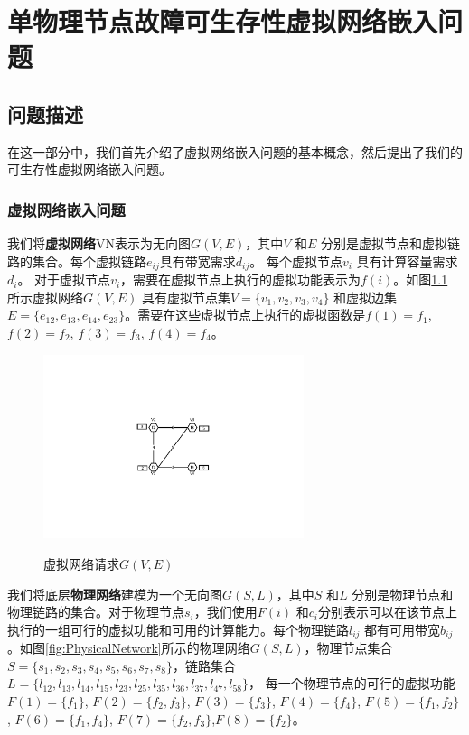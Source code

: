 \chapter{单物理节点故障可生存性虚拟网络嵌入问题}
\section{问题描述}
在这一部分中，我们首先介绍了虚拟网络嵌入问题的基本概念，然后提出了我们的可生存性虚拟网络嵌入问题。
\subsection{虚拟网络嵌入问题}
我们将\textbf{虚拟网络}VN表示为无向图$G (V,E)$，其中$V$ 和$E$ 分别是虚拟节点和虚拟链路的集合。每个虚拟链路$e_{ij}$具有带宽需求$d_{ij}$。 每个虚拟节点$v_i$ 具有计算容量需求$d_i$。 对于虚拟节点$v_i$，需要在虚拟节点上执行的虚拟功能表示为$f(i)$。如图\ref{fig:VirtualNetworkRequest} 所示虚拟网络$G (V,E)$ 具有虚拟节点集$V=\{v_1,v_2,v_3,v_4\}$ 和虚拟边集$E= \{e_{12},e_{13},e_{14},e_{23}\}$。需要在这些虚拟节点上执行的虚拟函数是$f(1)=f_1$, $f(2)=f_2$, $f(3)=f_3$, $f(4)=f_4$。

\begin{figure}[htbp]
\centering
\includegraphics[width=3.0in]{figures/VirtualNetworkRequest}\\
\caption{虚拟网络请求$G(V,E)$
}\label{fig:VirtualNetworkRequest}
\end{figure}

我们将底层\textbf{物理网络}建模为一个无向图$G (S,L)$，其中$S$ 和$L$ 分别是物理节点和物理链路的集合。对于物理节点$s_i$，我们使用$F(i)$ 和$c_i$分别表示可以在该节点上执行的一组可行的虚拟功能和可用的计算能力。每个物理链路$l_{ij}$ 都有可用带宽$b_{ij}$。如图\ref{fig:PhysicalNetwork}所示的物理网络$G (S,L)$，物理节点集合$S=\{s_1,s_2,s_3,s_4,s_5,s_6,s_7,s_8\}$，链路集合$L=\{l_{12},l_{13},l_{14},l_{15},l_{23},l_{25},l_{35},l_{36},l_{37},l_{47},l_{58}\}$，
每一个物理节点的可行的虚拟功能$F(1)=\{f_1\}$, $F(2)=\{f_2,f_3\}$, $F(3)=\{f_3\}$, $F(4)=\{f_4\}$, $F(5)=\{f_1,f_2\}$, $F(6)=\{f_1,f_4\}$, $F(7)=\{f_2,f_3\}$,$F(8)=\{f_2\}$。

